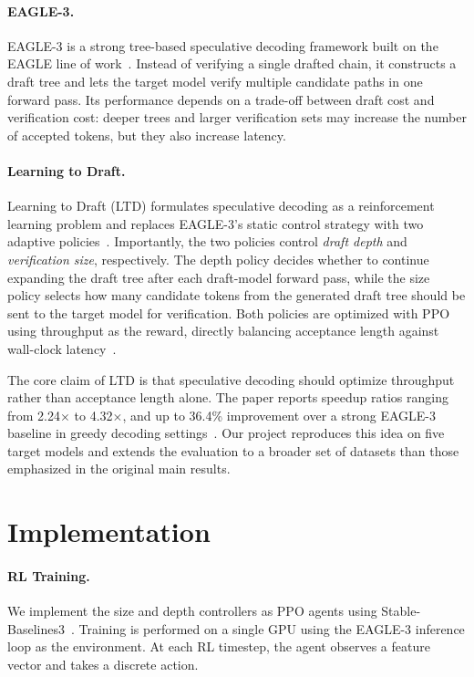 \documentclass[letterpaper,twocolumn,10pt]{article}
\begin{document}
\paragraph{EAGLE-3.}
EAGLE-3 is a strong tree-based speculative decoding framework built on the EAGLE line of work~\cite{eagle3,eagle2}. Instead of verifying a single drafted chain, it constructs a draft tree and lets the target model verify multiple candidate paths in one forward pass. Its performance depends on a trade-off between draft cost and verification cost: deeper trees and larger verification sets may increase the number of accepted tokens, but they also increase latency.

\paragraph{Learning to Draft.}
Learning to Draft (LTD) formulates speculative decoding as a reinforcement learning problem and replaces EAGLE-3's static control strategy with two adaptive policies~\cite{ltd2025}. Importantly, the two policies control \emph{draft depth} and \emph{verification size}, respectively. The depth policy decides whether to continue expanding the draft tree after each draft-model forward pass, while the size policy selects how many candidate tokens from the generated draft tree should be sent to the target model for verification. Both policies are optimized with PPO using throughput as the reward, directly balancing acceptance length against wall-clock latency~\cite{schulman2017ppo,sb3}.

The core claim of LTD is that speculative decoding should optimize throughput rather than acceptance length alone. The paper reports speedup ratios ranging from 2.24$\times$ to 4.32$\times$, and up to 36.4\% improvement over a strong EAGLE-3 baseline in greedy decoding settings~\cite{ltd2025}. Our project reproduces this idea on five target models and extends the evaluation to a broader set of datasets than those emphasized in the original main results.

\section{Implementation}

\paragraph{RL Training.}
We implement the size and depth controllers as PPO agents using Stable-Baselines3~\cite{sb3}. Training is performed on a single GPU using the EAGLE-3 inference loop as the environment. At each RL timestep, the agent observes a feature vector and takes a discrete action.
\end{document}
